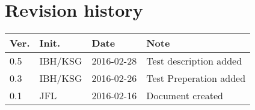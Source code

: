 \chapter*{Revision history}
\label{app:rev_his}


\begin{tabular}{b{1cm} b{1cm} b{2cm} b{8cm}}
    \textbf{Ver.} & \textbf{Init.} & \textbf{Date} & \textbf{Note} \\
    \hline
    0.5 & IBH/KSG & 2016-02-28 & Test description added \\
    0.3 & IBH/KSG & 2016-02-26 & Test Preperation added \\
    0.1 & JFL & 2016-02-16 & Document created \\
\end{tabular}
